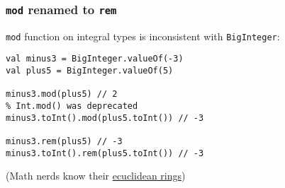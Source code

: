 \begin{frame}[fragile] \frametitle{\texttt{mod} renamed to \texttt{rem}}
 \texttt{mod} function on integral types is inconsistent with \texttt{BigInteger}:
\begin{lstlisting}
val minus3 = BigInteger.valueOf(-3)
val plus5 = BigInteger.valueOf(5)

minus3.mod(plus5) // 2
% Int.mod() was deprecated
minus3.toInt().mod(plus5.toInt()) // -3

minus3.rem(plus5) // -3
minus3.toInt().rem(plus5.toInt()) // -3
\end{lstlisting}
\small{(Math nerds know their \href{https://www.microsoft.com/en-us/research/wp-content/uploads/2016/02/divmodnote-letter.pdf}{ecuclidean rings})}
\end{frame}
